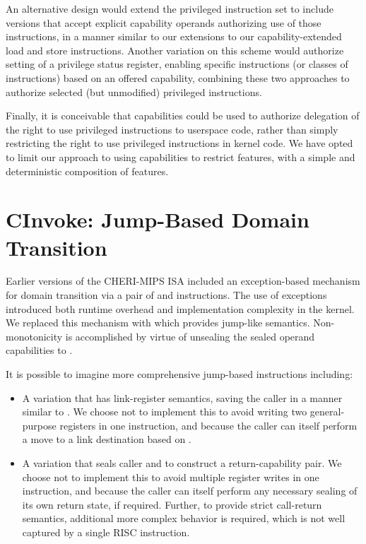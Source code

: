 An alternative design would extend the privileged instruction set to
include versions that accept explicit capability operands authorizing use of
those instructions, in a manner similar to our extensions to our
capability-extended load and store instructions.
Another variation on this scheme would authorize setting of a privilege status
register, enabling specific instructions (or classes of instructions) based on
an offered capability, combining these two approaches to authorize selected
(but unmodified) privileged instructions.

Finally, it is conceivable that capabilities could be used to authorize
delegation of the right to use privileged instructions to userspace code,
rather than simply restricting the right to use privileged instructions in
kernel code.
We have opted to limit our approach to using capabilities to restrict features,
with a simple and deterministic composition of features.

\section{CInvoke: Jump-Based Domain Transition}
\label{sec:jump-based-domain-transition}

Earlier versions of the CHERI-MIPS ISA included an exception-based
mechanism for domain transition via a pair of 
and  instructions.  The use of exceptions
introduced both runtime overhead and implementation complexity in the
kernel.  We replaced this mechanism with 
which provides jump-like semantics.
Non-monotonicity is accomplished by virtue of unsealing the sealed
operand capabilities to .

It is possible to imagine more comprehensive jump-based instructions
including:
\begin{itemize}
\item A variation that has link-register semantics, saving the caller \PCC{}
  in a manner similar to .
  We choose not to implement this to avoid writing two general-purpose registers
  in one instruction, and because the
  caller can itself perform a move to a link destination based on
  .

\item A variation that seals caller \PCC{} and \IDC{} to construct a
  return-capability pair.
  We choose not to implement this to avoid multiple register writes in one instruction,
  and because the
  caller can itself perform any necessary sealing of its own return state, if
  required.
  Further, to provide strict call-return semantics, additional more complex
  behavior is required, which is not well captured by a single RISC
  instruction.
\end{itemize}


